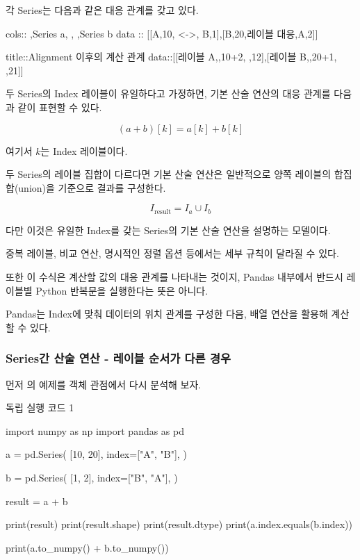 각 Series는 다음과 같은 대응 관계를 갖고 있다.

\begin{dhkmatrix}[delim=none,style=plain]
cols:: ,Series a, , ,Series b
data :: [[A,10, <->, B,1],[B,20,레이블 대응,A,2]]
\end{dhkmatrix}

\begin{dhkmatrix}[delim=none,style=plain]
title::Alignment 이후의 계산 관계
data::[[레이블 A,,10+2, ,12],[레이블 B,,20+1, ,21]]
\end{dhkmatrix}

두 Series의 Index 레이블이 유일하다고 가정하면, 기본 산술 연산의 대응 관계를 다음과 같이 표현할 수 있다.

\[
(a+b)[k]=a[k]+b[k]
\]

여기서 \(k\)는 Index 레이블이다.

두 Series의 레이블 집합이 다르다면 기본 산술 연산은 일반적으로 양쪽 레이블의 합집합(union)을 기준으로 결과를 구성한다.

\[
I_{\text{result}}=I_a\cup I_b
\]

다만 이것은 유일한 Index를 갖는 Series의 기본 산술 연산을 설명하는 모델이다.

중복 레이블, 비교 연산, 명시적인 정렬 옵션 등에서는 세부 규칙이 달라질 수 있다.

또한 이 수식은 계산할 값의 대응 관계를 나타내는 것이지, Pandas 내부에서 반드시 레이블별 Python 반복문을 실행한다는 뜻은 아니다.

Pandas는 Index에 맞춰 데이터의 위치 관계를 구성한 다음, 배열 연산을 활용해 계산할 수 있다.

\subsubsection{Series간 산술 연산 - 레이블 순서가 다른 경우}

먼저 의 예제를 객체 관점에서 다시 분석해 보자.

\begin{dhknote}
\begin{dhksmry}[centered]
독립 실행 코드 1
\end{dhksmry}
\end{dhknote}

\begin{dhkcode}
import numpy as np
import pandas as pd

a = pd.Series(
    [10, 20],
    index=["A", "B"],
)

b = pd.Series(
    [1, 2],
    index=["B", "A"],
)

result = a + b

print(result)
print(result.shape)
print(result.dtype)
print(a.index.equals(b.index))

print(a.to_numpy() + b.to_numpy())
\end{dhkcode}

